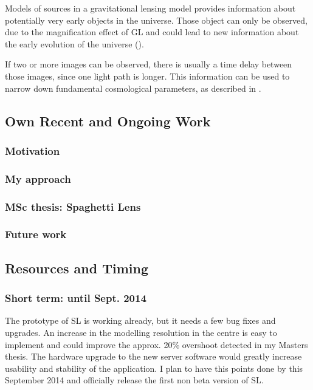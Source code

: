 \documentclass[11pt]{article}
\begin{document}
Models of sources in a gravitational lensing model provides information about potentially very early objects in the universe.
Those object can only be observed, due to the magnification effect of GL and could lead to new information about the early evolution of the universe (\cite{rusin03}).

If two or more images can be observed, there is usually a time delay between those images, since one light path is longer.
This information can be used to narrow down fundamental cosmological parameters, as described in \cite{refsdal1964}.


\subsection{Own Recent and Ongoing Work}

\subsubsection{Motivation}

\subsubsection{My approach}

\subsubsection{MSc thesis: Spaghetti Lens}

\subsubsection{Future work}




\subsection{Resources and Timing}

\subsubsection{Short term: until Sept. 2014}
The prototype of SL is working already, but it needs a few bug fixes and upgrades.
An increase in the modelling resolution in the centre is easy to implement and could improve the approx. 20\% overshoot detected in my Masters thesis.
The hardware upgrade to the new server software would greatly increase usability and stability of the application.
I plan to have this points done by this September 2014 and officially release the first non beta version of SL.
\end{document}

